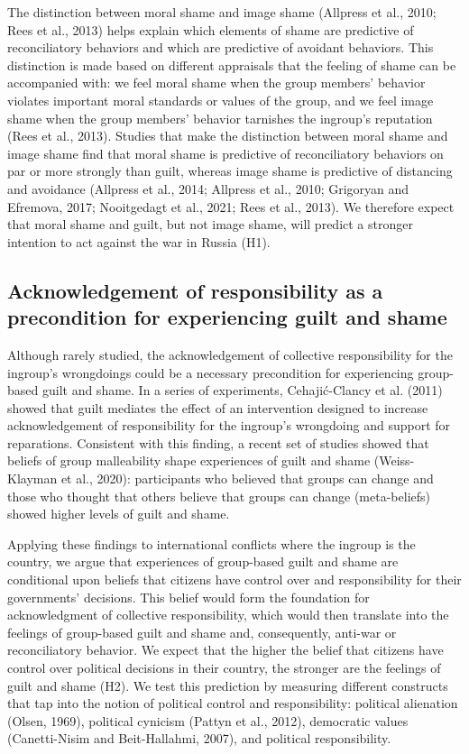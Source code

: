 \documentclass[
]{article}
\begin{document}
The distinction between moral shame and image shame (Allpress et al., 2010; Rees et al., 2013) helps explain which elements of shame are predictive of reconciliatory behaviors and which are predictive of avoidant behaviors. This distinction is made based on different appraisals that the feeling of shame can be accompanied with: we feel moral shame when the group members' behavior violates important moral standards or values of the group, and we feel image shame when the group members' behavior tarnishes the ingroup's reputation (Rees et al., 2013). Studies that make the distinction between moral shame and image shame find that moral shame is predictive of reconciliatory behaviors on par or more strongly than guilt, whereas image shame is predictive of distancing and avoidance (Allpress et al., 2014; Allpress et al., 2010; Grigoryan and Efremova, 2017; Nooitgedagt et al., 2021; Rees et al., 2013). We therefore expect that moral shame and guilt, but not image shame, will predict a stronger intention to act against the war in Russia (H1).

\subsection*{Acknowledgement of responsibility as a precondition for experiencing guilt and shame}\label{acknowledgement-of-responsibility-as-a-precondition-for-experiencing-guilt-and-shame}

Although rarely studied, the acknowledgement of collective responsibility for the ingroup's wrongdoings could be a necessary precondition for experiencing group-based guilt and shame. In a series of experiments, Cehajić-Clancy et al. (2011) showed that guilt mediates the effect of an intervention designed to increase acknowledgement of responsibility for the ingroup's wrongdoing and support for reparations. Consistent with this finding, a recent set of studies showed that beliefs of group malleability shape experiences of guilt and shame (Weiss-Klayman et al., 2020): participants who believed that groups can change and those who thought that others believe that groups can change (meta-beliefs) showed higher levels of guilt and shame.

Applying these findings to international conflicts where the ingroup is the country, we argue that experiences of group-based guilt and shame are conditional upon beliefs that citizens have control over and responsibility for their governments' decisions. This belief would form the foundation for acknowledgment of collective responsibility, which would then translate into the feelings of group-based guilt and shame and, consequently, anti-war or reconciliatory behavior. We expect that the higher the belief that citizens have control over political decisions in their country, the stronger are the feelings of guilt and shame (H2). We test this prediction by measuring different constructs that tap into the notion of political control and responsibility: political alienation (Olsen, 1969), political cynicism (Pattyn et al., 2012), democratic values (Canetti-Nisim and Beit-Hallahmi, 2007), and political responsibility.
\end{document}
